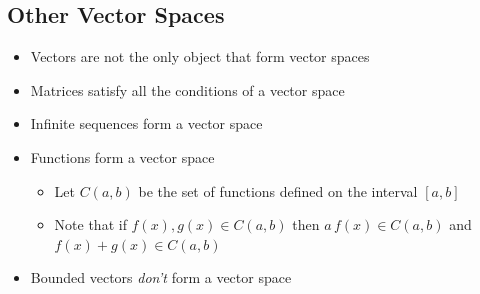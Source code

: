 \begin{slide}
\section{Other Vector Spaces}

\begin{PauseHighLight}
  \begin{itemize}
  \item Vectors are not the only object that form vector spaces\pause
  \item Matrices satisfy all the conditions of a vector space\pause
  \item Infinite sequences form a vector space\pause
  \item Functions form a vector space\pause
    \begin{itemize}\squeeze
    \item Let $C(a,b)$ be the set of functions defined on the interval
      $[a,b]$
    \item Note that if $f(x), g(x) \in C(a,b)$ then $a\,f(x) \in C(a,b)$
      and $f(x)+g(x) \in C(a,b)$\pause
    \end{itemize}
  \item Bounded vectors \emph{don't} form a vector space\pause
  \end{itemize}
\end{PauseHighLight}

\end{slide}


